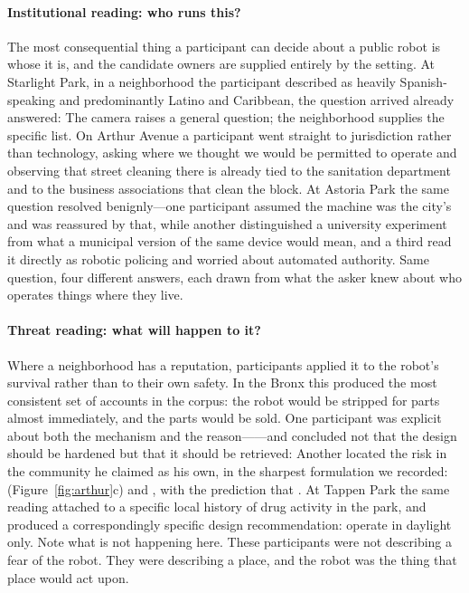 \paragraph{Institutional reading: who runs this?}
The most consequential thing a participant can decide about a public robot is
whose it is, and the candidate owners are supplied entirely by the setting. At
Starlight Park, in a neighborhood the participant described as heavily
Spanish-speaking and predominantly Latino and Caribbean, the question arrived
already answered:  The camera raises a general question; the
neighborhood supplies the specific list. On Arthur Avenue a participant went
straight to jurisdiction rather than technology, asking where we thought we would
be permitted to operate and observing that street cleaning there is already tied
to the sanitation department and to the business associations that clean the
block. At Astoria Park the same question resolved benignly---one participant
assumed the machine was the city's and was reassured by that, while another
distinguished a university experiment from what a municipal version of the same
device would mean, and a third read it directly as robotic policing and worried
about automated authority. Same question, four different answers, each drawn from
what the asker knew about who operates things where they live.

\paragraph{Threat reading: what will happen to it?}
Where a neighborhood has a reputation, participants applied it to the robot's
survival rather than to their own safety. In the Bronx this produced the most
consistent set of accounts in the corpus: the robot would be stripped for parts
almost immediately, and the parts would be sold. One participant was explicit
about both the mechanism and the reason------and concluded not that the design should be hardened but
that it should be retrieved:  Another located the risk in the community he
claimed as his own, in the sharpest formulation we recorded:
 (Figure~\ref{fig:arthur}c) and , with the prediction that . At Tappen Park the same reading attached to
a specific local history of drug activity in the park, and produced a
correspondingly specific design recommendation: operate in daylight only. Note
what is not happening here. These participants were not describing a fear of the
robot. They were describing a place, and the robot was the thing that place would
act upon.

